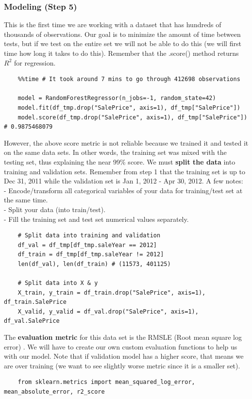 \documentclass[11pt, a4paper]{article}
\begin{document}
\begin{spacing}{1.1}
	\subsubsection{Modeling (Step 5)}
	This is the first time we are working with a dataset that has hundreds of thousands of observations. Our goal is to minimize the amount of time between tests, but if we test on the entire set we will not be able to do this (we will first time how long it takes to do this). Remember that the .score() method returns $R^2$ for regression. 
	\begin{lstlisting}
	%%time # It took around 7 mins to go through 412698 observations 
	
	model = RandomForestRegressor(n_jobs=-1, random_state=42)
	model.fit(df_tmp.drop("SalePrice", axis=1), df_tmp["SalePrice"])
	model.score(df_tmp.drop("SalePrice", axis=1), df_tmp["SalePrice"]) # 0.9875468079 \end{lstlisting} \vspace*{1mm}
	However, the above score metric is not reliable because we trained it and tested it on the same data sets. In other words, the training set was mixed with the testing set, thus explaining the near 99\% score. We must \textbf{split the data} into training and validation sets. Remember from step 1 that the training set is up to Dec 31, 2011 while the validation set is Jan 1, 2012 - Apr 30, 2012. A few notes: \\
	\hspace*{3mm} - Encode/transform all categorical variables of your data for training/test set at the same time. \\
	\hspace*{3mm} - Split your data (into train/test). \\
	\hspace*{3mm} - Fill the training set and test set numerical values separately.
	\begin{lstlisting}
	# Split data into training and validation
	df_val = df_tmp[df_tmp.saleYear == 2012]
	df_train = df_tmp[df_tmp.saleYear != 2012]
	len(df_val), len(df_train) # (11573, 401125)
	
	# Split data into X & y
	X_train, y_train = df_train.drop("SalePrice", axis=1), df_train.SalePrice
	X_valid, y_valid = df_val.drop("SalePrice", axis=1), df_val.SalePrice \end{lstlisting} \vspace*{1mm}
	The \textbf{evaluation metric} for this data set is the RMSLE (Root mean square log error) . We will have to create our own custom evaluation functions to help us with our model. Note that if validation model has a higher score, that means we are over training (we want to see slightly worse metric since it is a smaller set). 
	\begin{lstlisting}
	from sklearn.metrics import mean_squared_log_error, mean_absolute_error, r2_score
	

\end{lstlisting}
\end{spacing}
\end{document}
